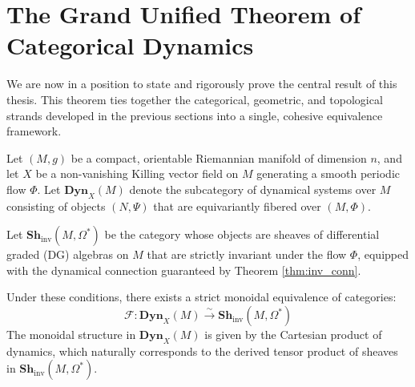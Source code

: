 \section{The Grand Unified Theorem of Categorical Dynamics}
\label{sec:gut}

We are now in a position to state and rigorously prove the central result of this thesis. This theorem ties together the categorical, geometric, and topological strands developed in the previous sections into a single, cohesive equivalence framework.

\begin{theorem}
\label{thm:gut}
Let $(M, g)$ be a compact, orientable Riemannian manifold of dimension $n$, and let $X$ be a non-vanishing Killing vector field on $M$ generating a smooth periodic flow $\Phi$. Let $\mathbf{Dyn}_X(M)$ denote the subcategory of dynamical systems over $M$ consisting of objects $(N, \Psi)$ that are equivariantly fibered over $(M, \Phi)$. 

Let $\mathbf{Sh}_{\text{inv}}(M, \Omega^*)$ be the category whose objects are sheaves of differential graded (DG) algebras on $M$ that are strictly invariant under the flow $\Phi$, equipped with the dynamical connection guaranteed by Theorem \ref{thm:inv_conn}. 

Under these conditions, there exists a strict monoidal equivalence of categories:
\[ \mathcal{F}: \mathbf{Dyn}_X(M) \xrightarrow{\sim} \mathbf{Sh}_{\text{inv}}(M, \Omega^*) \]
The monoidal structure in $\mathbf{Dyn}_X(M)$ is given by the Cartesian product of dynamics, which naturally corresponds to the derived tensor product of sheaves in $\mathbf{Sh}_{\text{inv}}(M, \Omega^*)$.
\end{theorem}

